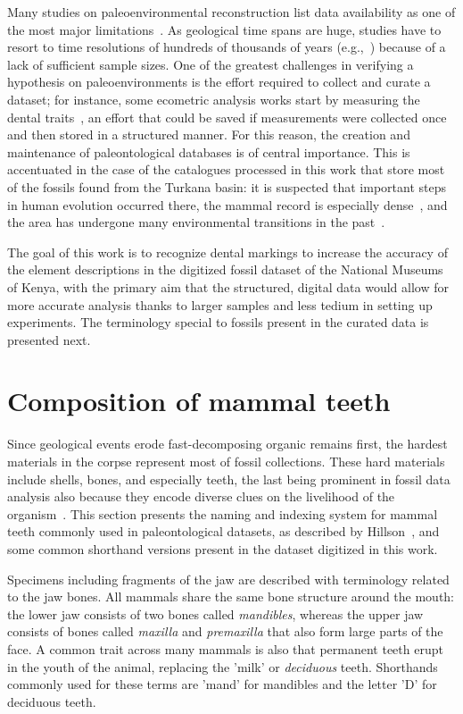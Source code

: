 \documentclass[english,twoside,openright]{UH_DS_MSc}
\begin{document}
Many studies on paleoenvironmental reconstruction list data availability as one of the most major limitations~\cite{oksanenHumboldtianApproachLife2019,fortelius}.
As geological time spans are huge, studies have to 
resort to time resolutions of hundreds of thousands of years (e.g.,~\cite {fortelius}) because of a lack 
of sufficient sample sizes. One of the greatest challenges in verifying a hypothesis on 
paleoenvironments is the effort required to collect and curate a dataset; for instance, some ecometric
analysis works start by measuring the dental traits~\cite{fortelius}, an effort that could be saved 
if measurements were collected once and then stored in a structured manner. For this reason, the 
creation and maintenance of paleontological databases is of central importance. This is accentuated 
in the case of the catalogues processed in this work that store most of the fossils found from the Turkana basin: it is suspected that
important steps in human evolution occurred there, the mammal record is especially dense~\cite{fortelius}, and the area has undergone many environmental transitions in the past~\cite{Zliobaite2023}.

The goal of this work is to recognize dental markings to increase the accuracy of the element descriptions in
the digitized fossil dataset of the National Museums of Kenya,
with the primary aim that the structured, digital data would allow for 
more accurate analysis thanks to larger samples and less tedium in 
setting up experiments. The terminology special to fossils present in 
the curated data is presented next.

\section{Composition of mammal teeth}
\label{sect:mammal_teeth}

Since geological events erode fast-decomposing organic remains first, the hardest materials in 
the corpse represent most of fossil collections. These hard materials include shells, bones, and especially teeth, the last being prominent in fossil data analysis also because they encode diverse clues on 
the livelihood of the organism~\cite{Faith_Lyman_2019}.
This section presents the naming and indexing system for mammal teeth commonly used in paleontological datasets,
as described by Hillson~\cite{Hillson_2005}, and some common shorthand versions present in the dataset digitized in this work.

Specimens including fragments of the jaw are described with terminology related 
to the jaw bones. All mammals share the same bone structure around the mouth: the lower jaw consists 
of two bones called \textit{mandibles}, whereas the upper jaw consists of bones called 
\textit{maxilla} and \textit{premaxilla} that also form large parts of the face.
A common trait across many mammals is also that permanent teeth erupt in the 
youth of the animal, replacing the 'milk' or \textit{deciduous} teeth. Shorthands commonly used for these 
terms are 'mand' for mandibles and the letter 'D' for deciduous teeth.
\end{document}
